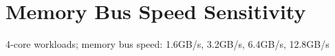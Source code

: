 \section{Memory Bus Speed Sensitivity}
\label{sec:results:l2size_sensitivity}

4-core workloads; memory bus speed: 1.6GB/s, 3.2GB/s, 6.4GB/s, 12.8GB/s